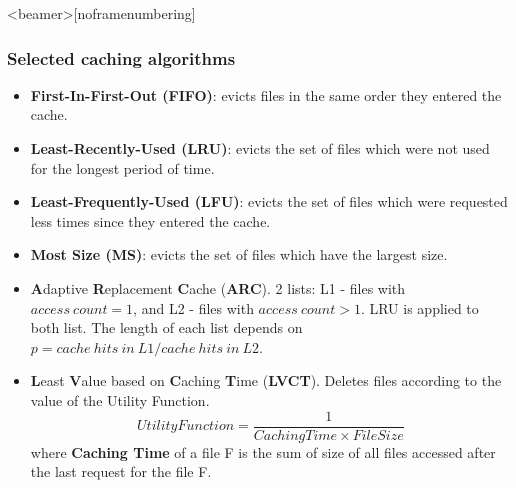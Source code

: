\documentclass{beamer}
\begin{document}
\begin{frame}<beamer>[noframenumbering]\frametitle{Selected caching algorithms}
\begin{footnotesize}
\begin{itemize}
\item \textbf{First-In-First-Out (FIFO)}: evicts files in the same order they entered the cache.
\item\textbf{Least-Recently-Used (LRU)}: evicts the set of files which were not used for the longest period of time.

\item \textbf{Least-Frequently-Used (LFU)}: evicts the set of files which were requested less times since they entered the cache.

\item \textbf{Most Size (MS)}: evicts the set of files which have the largest size.

\item \textbf{A}daptive \textbf{R}eplacement \textbf{C}ache (\textbf{ARC}). 2 lists: L1 - files with $access~count=1$, and L2 - files with $access~count>1$. LRU is applied to both list. The length of each list depends on $p = cache~hits~in~L1 / cache~hits~in~L2$.


\item \textbf{L}east \textbf{V}alue based on \textbf{C}aching \textbf{T}ime (\textbf{LVCT}).
Deletes files according to the value of the  Utility Function.
\begin{equation}
Utility Function = \frac{1}{Caching Time \times File Size}
\end{equation}   
where \textbf{Caching Time} of a file F is the sum of size of all files accessed after the last request for the file F.

\end{itemize}
\end{footnotesize}
\end{frame}
\end{document}
